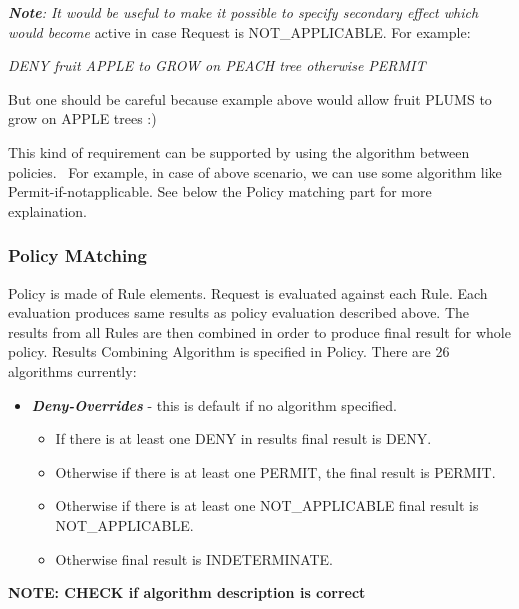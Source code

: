 \documentclass[a4paper]{article}
\newcommand\liststyleWWviiiNumxxi{%
\renewcommand\labelitemi{[F0B7?]}
\renewcommand\labelitemii{o}
\renewcommand\labelitemiii{[F0A7?]}
\renewcommand\labelitemiv{[F0B7?]}
}
\begin{document}
{\upshape\color{black}
\foreignlanguage{english}{\textbf{\textit{Note}}}\foreignlanguage{english}{\textit{:
It would be useful to make it possible to specify secondary effect
which would become }}\foreignlanguage{english}{active in case Request
is NOT\_APPLICABLE. For example:}}

{\itshape\color{black}
DENY fruit APPLE to GROW on PEACH tree otherwise PERMIT}

{\color{black}
But one should be careful because example above would allow fruit PLUMS
to grow on APPLE trees :)}

{\color{black}
This kind of requirement can be supported by using the algorithm between
policies. \ For example, in case of above scenario, we can use some
algorithm like {\textquotedbl}Permit-if-notapplicable{\textquotedbl}.
See below the {\textquotedbl}Policy matching{\textquotedbl} part for
more explaination. \ }

\subsubsection{Policy MAtching}
{\color{black}
Policy is made of Rule elements. Request is evaluated against each Rule.
Each evaluation produces same results as policy evaluation described
above. The results from all Rules are then combined in order to produce
final result for whole policy. Results Combining Algorithm is specified
in Policy. There are 26 algorithms currently:}

\liststyleWWviiiNumxxi
\begin{itemize}
\item {\color{black}
\foreignlanguage{english}{\textbf{\textit{Deny-Overrides}}}\foreignlanguage{english}{
- this is default if no algorithm specified.}}

\begin{itemize}
\item {\color{black}
If there is at least one DENY in results final result is DENY.}
\item {\color{black}
Otherwise if there is at least one PERMIT, the final result is PERMIT.}
\item {\color{black}
Otherwise if there is at least one NOT\_APPLICABLE final result is
NOT\_APPLICABLE.}
\item {\color{black}
Otherwise final result is INDETERMINATE.}
\end{itemize}
\end{itemize}
{\bfseries\color{black}
NOTE: CHECK if algorithm description is correct}
\end{document}
